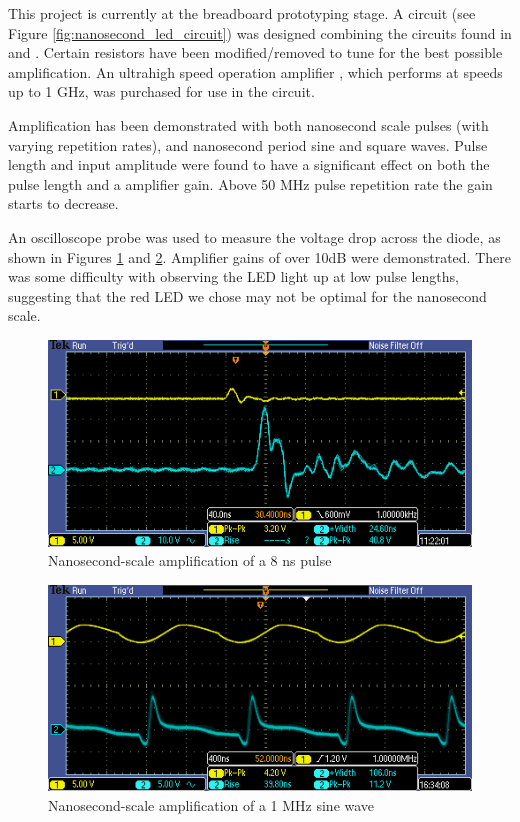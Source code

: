 \documentclass{article}
\begin{document}
    This project is currently at the breadboard prototyping stage. A circuit (see Figure \ref{fig:nanosecond_led_circuit}) was designed combining the circuits found in \cite{nanosecond_led} and \cite{high_speed_amps}. Certain resistors have been modified/removed to tune for the best possible amplification. An ultrahigh speed operation amplifier \cite{ad8009}, which performs at speeds up to 1 GHz, was purchased for use in the circuit.
    
    Amplification has been demonstrated with both nanosecond scale pulses (with varying repetition rates), and nanosecond period sine and square waves. Pulse length and input amplitude were found to have a significant effect on both the pulse length and a amplifier gain. Above 50 MHz pulse repetition rate the gain starts to decrease. 
    
    An oscilloscope probe was used to measure the voltage drop across the diode, as shown in Figures \ref{fig:pulse_amplfication} and \ref{fig:wave_amplification}. Amplifier gains of over 10dB were demonstrated. There was some difficulty with observing the LED light up at low pulse lengths, suggesting that the red LED\cite{cree_xpe_led} we chose may not be optimal for the nanosecond scale.
    
    \begin{figure}[h]
        \centering
        \includegraphics[scale=0.5]{img/pulse_amplification}
        \caption{Nanosecond-scale amplification of a 8 ns pulse}
        \label{fig:pulse_amplfication}
    \end{figure}
    
    \begin{figure}[h]
        \centering
        \includegraphics[scale=0.5]{img/wave_amplification}
        \caption{Nanosecond-scale amplification of a 1 MHz sine wave}
        \label{fig:wave_amplification}
    \end{figure}
    
\end{document}
